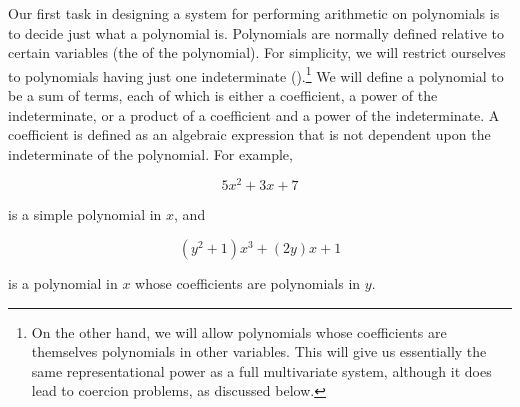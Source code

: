 Our first task in designing a system for performing arithmetic on polynomials
is to decide just what a polynomial is.  Polynomials are normally defined
relative to certain variables (the  of the polynomial).
For simplicity, we will restrict ourselves to polynomials having just one
indeterminate ().\footnote{On the other hand,
we will allow polynomials whose coefficients are themselves polynomials in
other variables.  This will give us essentially the same representational power
as a full multivariate system, although it does lead to coercion problems, as
discussed below.} We will define a polynomial to be a sum of terms, each of
which is either a coefficient, a power of the indeterminate, or a product of a
coefficient and a power of the indeterminate.  A coefficient is defined as an
algebraic expression that is not dependent upon the indeterminate of the
polynomial.  For example,
\begin{comment}

\begin{example}
5x^2 + 3x + 7
\end{example}

\end{comment}

$$ 5x^2 + 3x + 7 $$

\noindent
is a simple polynomial in \( x \), and
\begin{comment}

\begin{example}
(y^2 + 1)x^3 + (2y)x + 1
\end{example}

\end{comment}

$$ (y^2 + 1)x^3 + (2y)x + 1 $$

\noindent
is a polynomial in \( x \) whose coefficients are polynomials in \( y \).

